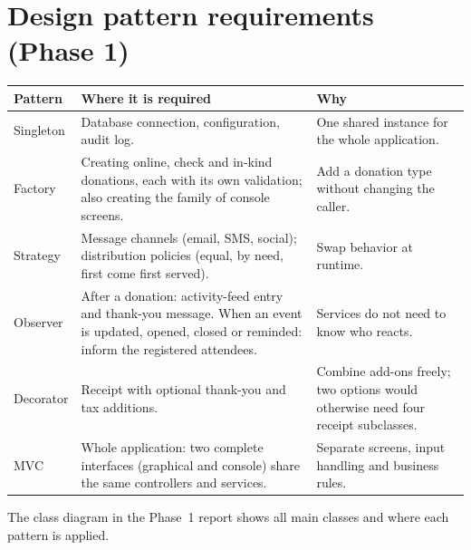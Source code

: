 \section{Design pattern requirements (Phase 1)}
\label{sec:patterns}

\begin{center}
\small
\begin{tabularx}{\textwidth}{@{}L{0.13\textwidth}YL{0.30\textwidth}@{}}
\toprule
\textbf{Pattern} & \textbf{Where it is required} & \textbf{Why} \\
\midrule
Singleton & Database connection, configuration, audit log. & One shared instance for the whole application. \\
Factory & Creating online, check and in-kind donations, each with its own validation; also creating the family of console screens. & Add a donation type without changing the caller. \\
Strategy & Message channels (email, SMS, social); distribution policies (equal, by need, first come first served). & Swap behavior at runtime. \\
Observer & After a donation: activity-feed entry and thank-you message. When an event is updated, opened, closed or reminded: inform the registered attendees. & Services do not need to know who reacts. \\
Decorator & Receipt with optional thank-you and tax additions. & Combine add-ons freely; two options would otherwise need four receipt subclasses. \\
MVC & Whole application: two complete interfaces (graphical and console) share the same controllers and services. & Separate screens, input handling and business rules. \\
\bottomrule
\end{tabularx}
\end{center}

The class diagram in the Phase~1 report shows all main classes and where each pattern is applied.

